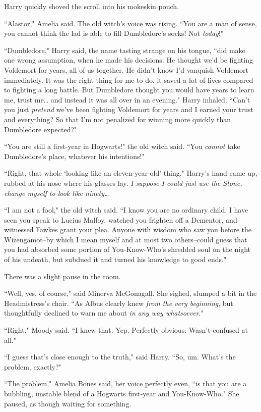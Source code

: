Harry quickly shoved the scroll into his mokeskin pouch.

``Alastor," Amelia said. The old witch's voice was rising. ``You are a man of sense, you cannot think the lad is able to fill Dumbledore's socks! Not \emph{today}!"

``Dumbledore," Harry said, the name tasting strange on his tongue, ``did make one wrong assumption, when he made his decisions. He thought we'd be fighting Voldemort for years, all of us together. He didn't know I'd vanquish Voldemort immediately. It was the right thing for me to do, it saved a lot of lives compared to fighting a long battle. But Dumbledore thought you would have years to learn me, trust me{\ldots} and instead it was all over in an evening." Harry inhaled. ``Can't you just \emph{pretend} we've been fighting Voldemort for years and I earned your trust and everything? So that I'm not penalized for winning more quickly than Dumbledore expected?"

``You are still a first-year in Hogwarts!" the old witch said. ``You \emph{cannot} take Dumbledore's place, whatever his intentions!"

``Right, that whole `looking like an eleven-year-old' thing." Harry's hand came up, rubbed at his nose where his glasses lay. \emph{I suppose I could just use the Stone, change myself to look like ninety{\ldots}}

``I am not a fool," the old witch said. ``I know you are no ordinary child. I have seen you speak to Lucius Malfoy, watched you frighten off a Dementor, and witnessed Fawkes grant your plea. Anyone with wisdom who saw you before the Wizengamot\---by which I mean myself and at most two others\---could guess that you had absorbed some portion of You-Know-Who's shredded soul on the night of his undeath, but subdued it and turned his knowledge to good ends."

There was a slight pause in the room.

``Well, yes, of course," said Minerva McGonagall. She sighed, slumped a bit in the Headmistress's chair. ``As Albus clearly knew \emph{from the very beginning}, but thoughtfully declined to warn me about \emph{in any way whatsoever}."

``Right," Moody said. ``I knew that. Yep. Perfectly obvious. Wasn't confused at all."

``I guess that's close enough to the truth," said Harry. ``So, um. What's the problem, exactly?"

``The problem," Amelia Bones said, her voice perfectly even, ``is that you are a bubbling, unstable blend of a Hogwarts first-year and You-Know-Who." She paused, as though waiting for something.

